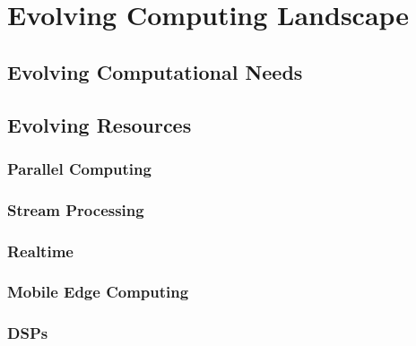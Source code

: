 \chapter{Evolving Computing Landscape}
\label{chapter:background}
\section{Evolving Computational Needs}
\section{Evolving Resources}
\subsection{Parallel Computing}
\subsection{Stream Processing}
\subsection{Realtime}
\subsection{Mobile Edge Computing}
\subsection{DSPs}
